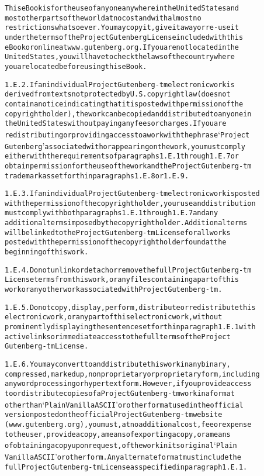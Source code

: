 \documentclass[12pt]{book}[2005/09/16]
\newenvironment{PGtext}{%
\begin{alltt}
\fontsize{9.2}{10.5}\ttfamily\selectfont}%
{\end{alltt}}
\begin{document}
\begin{PGtext}
  This eBook is for the use of anyone anywhere in the United States and
  most other parts of the world at no cost and with almost no
  restrictions whatsoever. You may copy it, give it away or re-use it
  under the terms of the Project Gutenberg License included with this
  eBook or online at www.gutenberg.org. If you are not located in the
  United States, you will have to check the laws of the country where
  you are located before using this eBook.

1.E.2. If an individual Project Gutenberg-tm electronic work is
derived from texts not protected by U.S. copyright law (does not
contain a notice indicating that it is posted with permission of the
copyright holder), the work can be copied and distributed to anyone in
the United States without paying any fees or charges. If you are
redistributing or providing access to a work with the phrase `Project
Gutenberg' associated with or appearing on the work, you must comply
either with the requirements of paragraphs 1.E.1 through 1.E.7 or
obtain permission for the use of the work and the Project Gutenberg-tm
trademark as set forth in paragraphs 1.E.8 or 1.E.9.

1.E.3. If an individual Project Gutenberg-tm electronic work is posted
with the permission of the copyright holder, your use and distribution
must comply with both paragraphs 1.E.1 through 1.E.7 and any
additional terms imposed by the copyright holder. Additional terms
will be linked to the Project Gutenberg-tm License for all works
posted with the permission of the copyright holder found at the
beginning of this work.

1.E.4. Do not unlink or detach or remove the full Project Gutenberg-tm
License terms from this work, or any files containing a part of this
work or any other work associated with Project Gutenberg-tm.

1.E.5. Do not copy, display, perform, distribute or redistribute this
electronic work, or any part of this electronic work, without
prominently displaying the sentence set forth in paragraph 1.E.1 with
active links or immediate access to the full terms of the Project
Gutenberg-tm License.

1.E.6. You may convert to and distribute this work in any binary,
compressed, marked up, nonproprietary or proprietary form, including
any word processing or hypertext form. However, if you provide access
to or distribute copies of a Project Gutenberg-tm work in a format
other than `Plain Vanilla ASCII' or other format used in the official
version posted on the official Project Gutenberg-tm website
(www.gutenberg.org), you must, at no additional cost, fee or expense
to the user, provide a copy, a means of exporting a copy, or a means
of obtaining a copy upon request, of the work in its original `Plain
Vanilla ASCII' or other form. Any alternate format must include the
full Project Gutenberg-tm License as specified in paragraph 1.E.1.


\end{PGtext}
\end{document}
